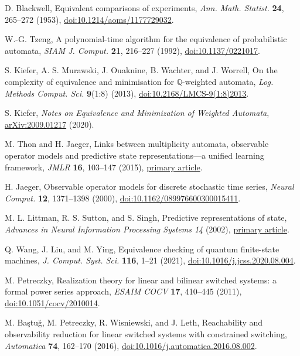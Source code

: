  D. Blackwell, Equivalent comparisons of experiments, \emph{Ann. Math. Statist.} \textbf{24}, 265--272 (1953), \href{https://doi.org/10.1214/aoms/1177729032}{doi:10.1214/aoms/1177729032}.

 W.-G. Tzeng, A polynomial-time algorithm for the equivalence of probabilistic automata, \emph{SIAM J. Comput.} \textbf{21}, 216--227 (1992), \href{https://doi.org/10.1137/0221017}{doi:10.1137/0221017}.

 S. Kiefer, A. S. Murawski, J. Ouaknine, B. Wachter, and J. Worrell, On the complexity of equivalence and minimisation for $\mathbb Q$-weighted automata, \emph{Log. Methods Comput. Sci.} \textbf{9}(1:8) (2013), \href{https://doi.org/10.2168/LMCS-9(1:8)2013}{doi:10.2168/LMCS-9(1:8)2013}.

 S. Kiefer, \emph{Notes on Equivalence and Minimization of Weighted Automata}, \href{https://arxiv.org/abs/2009.01217}{arXiv:2009.01217} (2020).

 M. Thon and H. Jaeger, Links between multiplicity automata, observable operator models and predictive state representations---a unified learning framework, \emph{JMLR} \textbf{16}, 103--147 (2015), \href{https://jmlr.org/papers/v16/thon15a.html}{primary article}.

 H. Jaeger, Observable operator models for discrete stochastic time series, \emph{Neural Comput.} \textbf{12}, 1371--1398 (2000), \href{https://doi.org/10.1162/089976600300015411}{doi:10.1162/089976600300015411}.

 M. L. Littman, R. S. Sutton, and S. Singh, Predictive representations of state, \emph{Advances in Neural Information Processing Systems 14} (2002), \href{https://papers.neurips.cc/paper/1983-predictive-representations-of-state.pdf}{primary article}.

 Q. Wang, J. Liu, and M. Ying, Equivalence checking of quantum finite-state machines, \emph{J. Comput. Syst. Sci.} \textbf{116}, 1--21 (2021), \href{https://doi.org/10.1016/j.jcss.2020.08.004}{doi:10.1016/j.jcss.2020.08.004}.

 M. Petreczky, Realization theory for linear and bilinear switched systems: a formal power series approach, \emph{ESAIM COCV} \textbf{17}, 410--445 (2011), \href{https://doi.org/10.1051/cocv/2010014}{doi:10.1051/cocv/2010014}.

 M. Ba\c{s}tu\u{g}, M. Petreczky, R. Wisniewski, and J. Leth, Reachability and observability reduction for linear switched systems with constrained switching, \emph{Automatica} \textbf{74}, 162--170 (2016), \href{https://doi.org/10.1016/j.automatica.2016.08.002}{doi:10.1016/j.automatica.2016.08.002}.

